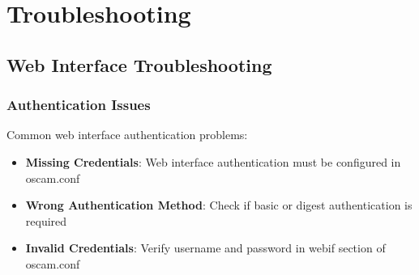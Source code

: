 \documentclass[a4paper,11pt]{report}
\begin{document}
\chapter{Troubleshooting}

\section{Web Interface Troubleshooting}

\subsection{Authentication Issues}
\begin{warningbox}
Common web interface authentication problems:
\begin{itemize}
    \item \textbf{Missing Credentials}: Web interface authentication must be configured in oscam.conf
    \item \textbf{Wrong Authentication Method}: Check if basic or digest authentication is required
    \item \textbf{Invalid Credentials}: Verify username and password in webif section of oscam.conf
\end{itemize}
\end{warningbox}
\end{document}
